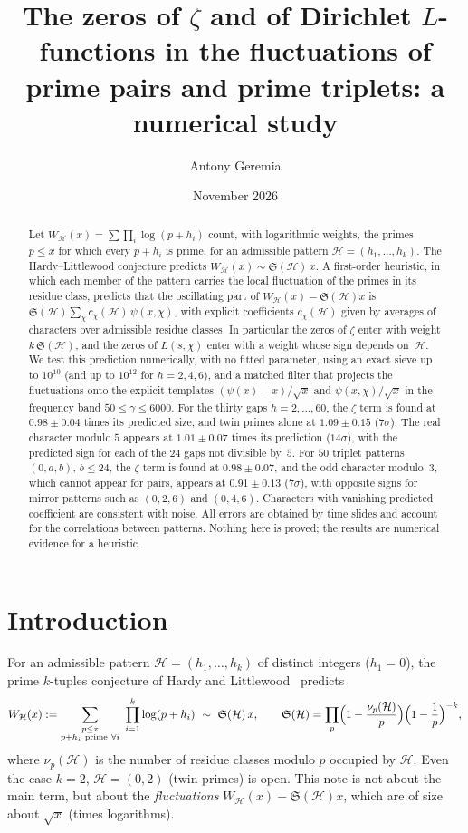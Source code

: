 \documentclass[11pt]{amsart}
\title[Zeros of $\zeta$ and $L$-functions in prime pairs and triplets]{The zeros of $\zeta$ and of Dirichlet $L$-functions in the fluctuations of prime pairs and prime triplets: a numerical study}
\author{Antony Geremia}
\date{November 2026}
\theoremstyle{remark}
\newcommand{\Sing}{\mathfrak{S}}
\newcommand{\cH}{\mathcal{H}}
\begin{document}
\begin{abstract}
Let $W_\cH(x)=\sum \prod_i \log(p+h_i)$ count, with logarithmic weights, the primes $p\le x$ for which every $p+h_i$ is prime, for an admissible pattern $\cH=(h_1,\dots,h_k)$. The Hardy--Littlewood conjecture predicts $W_\cH(x)\sim\Sing(\cH)\,x$. A first-order heuristic, in which each member of the pattern carries the local fluctuation of the primes in its residue class, predicts that the oscillating part of $W_\cH(x)-\Sing(\cH)x$ is $\Sing(\cH)\sum_\chi c_\chi(\cH)\,\psi(x,\chi)$, with explicit coefficients $c_\chi(\cH)$ given by averages of characters over admissible residue classes. In particular the zeros of $\zeta$ enter with weight $k\,\Sing(\cH)$, and the zeros of $L(s,\chi)$ enter with a weight whose sign depends on~$\cH$.
We test this prediction numerically, with no fitted parameter, using an exact sieve up to $10^{10}$ (and up to $10^{12}$ for $h=2,4,6$), and a matched filter that projects the fluctuations onto the explicit templates $(\psi(x)-x)/\sqrt{x}$ and $\psi(x,\chi)/\sqrt{x}$ in the frequency band $50\le\gamma\le 6000$. For the thirty gaps $h=2,\dots,60$, the $\zeta$ term is found at $0.98\pm0.04$ times its predicted size, and twin primes alone at $1.09\pm0.15$ ($7\sigma$). The real character modulo $5$ appears at $1.01\pm0.07$ times its prediction ($14\sigma$), with the predicted sign for each of the $24$ gaps not divisible by~$5$. For $50$ triplet patterns $(0,a,b)$, $b\le 24$, the $\zeta$ term is found at $0.98\pm0.07$, and the odd character modulo~$3$, which cannot appear for pairs, appears at $0.91\pm0.13$ ($7\sigma$), with opposite signs for mirror patterns such as $(0,2,6)$ and $(0,4,6)$. Characters with vanishing predicted coefficient are consistent with noise. All errors are obtained by time slides and account for the correlations between patterns. Nothing here is proved; the results are numerical evidence for a heuristic.
\end{abstract}

\maketitle

\section{Introduction}

For an admissible pattern $\cH=(h_1,\dots,h_k)$ of distinct integers ($h_1=0$), the prime $k$-tuples conjecture of Hardy and Littlewood~\cite{HL} predicts
\begin{equation}\label{eq:HL}
W_\cH(x):=\sum_{\substack{p\le x\\ p+h_i\ \text{prime}\ \forall i}}\ \prod_{i=1}^k\log(p+h_i)\ \sim\ \Sing(\cH)\,x,
\qquad
\Sing(\cH)=\prod_p\Bigl(1-\frac{\nu_p(\cH)}{p}\Bigr)\Bigl(1-\frac1p\Bigr)^{-k},
\end{equation}
where $\nu_p(\cH)$ is the number of residue classes modulo $p$ occupied by $\cH$. Even the case $k=2$, $\cH=(0,2)$ (twin primes) is open. This note is not about the main term, but about the \emph{fluctuations} $W_\cH(x)-\Sing(\cH)x$, which are of size about $\sqrt{x}$ (times logarithms).
\end{document}
